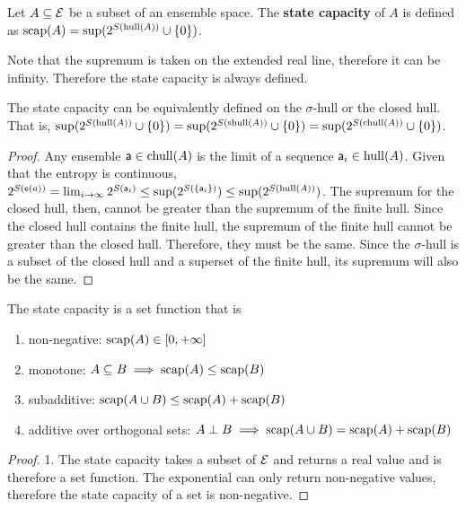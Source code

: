 \begin{mathSection}
\begin{defn}
	Let $A \subseteq \Ens$ be a subset of an ensemble space. The \textbf{state capacity} of $A$ is defined as $\capacity(A) = \sup(2^{S(\hull(A))}\cup\{0\})$.
\end{defn}

\begin{check}
	Note that the supremum is taken on the extended real line, therefore it can be infinity. Therefore the state capacity is always defined.
\end{check}

\begin{coro}
	The state capacity can be equivalently defined on the $\sigma$-hull or the closed hull. That is, $\sup(2^{S(\hull(A))}\cup\{0\}) = \sup(2^{S(\shull(A))}\cup\{0\}) = \sup(2^{S(\chull(A))}\cup\{0\})$.
\end{coro}

\begin{proof}
	Any ensemble $\ens[a] \in \chull(A)$ is the limit of a sequence $\ens[a]_i \in \hull(A)$. Given that the entropy is continuous, $2^{S(\ens(a))} = \lim_{i \to \infty} 2^{S(\ens[a]_i)} \leq \sup(2^{S(\{\ens[a]_i\})}) \leq \sup(2^{S(\hull(A))})$. The supremum for the closed hull, then, cannot be greater than the supremum of the finite hull. Since the closed hull contains the finite hull, the supremum of the finite hull cannot be greater than the closed hull. Therefore, they must be the same. Since the $\sigma$-hull is a subset of the closed hull and a superset of the finite hull, its supremum will also be the same.
\end{proof}

\begin{prop}
	The state capacity is a set function that is
	\begin{enumerate}
		\item non-negative: $\capacity(A) \in [0, +\infty]$
		\item monotone: $A \subseteq B \implies \capacity(A) \leq \capacity(B)$
		\item subadditive: $\capacity(A \cup B) \leq \capacity(A) + \capacity(B)$
		\item additive over orthogonal sets: $A \ortho B \implies \capacity(A \cup B) = \capacity(A) + \capacity(B)$ 
	\end{enumerate}
\end{prop}

\begin{proof}
	1. The state capacity takes a subset of $\Ens$ and returns a real value and is therefore a set function. The exponential can only return non-negative values, therefore the state capacity of a set is non-negative. 
	

\end{proof}
\end{mathSection}
